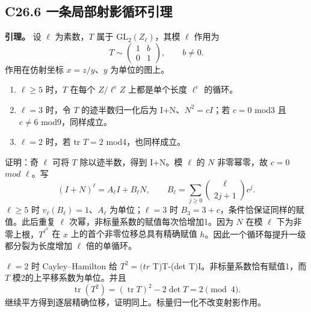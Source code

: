 \subsection*{\texorpdfstring{{C26.6} {一条局部射影循环引理}}{C26.6 一条局部射影循环引理}}\label{C26-h164}

\textbf{{引理。}} {设} {\ensuremath{\ell }} {为素数，\ensuremath{T}} {属于} {\ensuremath{\mathrm{GL}_{2}(Z_\ell )}，其模} {\ensuremath{\ell }} {作用为} \[
T\sim\begin{pmatrix}1&b\\0&1\end{pmatrix},\qquad b\ne0.
\] {作用在仿射坐标} {\ensuremath{x=z/y}、\ensuremath{y}} {为单位的图上。}

\begin{enumerate}
\def\labelenumi{\arabic{enumi}.}
\tightlist
\item
  {\ensuremath{\ell \ge 5}} {时，\ensuremath{T}} {在每个} {\ensuremath{Z/\ell ^{e}Z}} {上都是单个长度} {\ensuremath{\ell ^{e}}} {的循环。}
\item
  {\ensuremath{\ell =3}} {时，令} {\ensuremath{T}} {的迹半数归一化后为} {I+N、\ensuremath{N^{2}=cI}；若} {\ensuremath{c=0}} {mod3} {且} {\ensuremath{c\ne 6}} {mod9，同样成立。}
\item
  {\ensuremath{\ell =2}} {时，若} {tr} {\ensuremath{T=2}} {mod4，也同样成立。}
\end{enumerate}

{证明：奇} {\ensuremath{\ell }} {可将} {\ensuremath{T}} {除以迹半数，得到} {I+N。模} {\ensuremath{\ell }} {的} {\ensuremath{N}} {非零幂零，故} {\ensuremath{c=0}} {\ensuremath{mod}} {\ensuremath{\ell }。写} \[
(I+N)^\ell=A_\ell I+B_\ell N,\qquad
B_\ell=\sum_{j\ge0}\binom{\ell}{2j+1}c^j.
\] {\ensuremath{\ell \ge 5}} {时} {\ensuremath{v_\ell (B_\ell )=1}、\ensuremath{A_\ell }} {为单位；\ensuremath{\ell =3}} {时} {\ensuremath{B_{3}=3+c}，条件恰保证同样的赋值。此后重复} {\ensuremath{\ell }} {次幂，非标量系数的赋值每次恰增加1。因为} {\ensuremath{N}} {在模} {\ensuremath{\ell }} {下为非零上根，\ensuremath{T^{\ell ^{h}}}} {在} {\ensuremath{x}} {上的首个非零位移总具有精确赋值} {\ensuremath{h}。因此一个循环每提升一级都分裂为长度增加} {\ensuremath{\ell }} {倍的单循环。}

{\ensuremath{\ell =2}} {时} {Cayley--Hamilton} {给} {\ensuremath{T^{2}=(tr}} {T)T-(det} {T)I。非标量系数恰有赋值1，而} {\ensuremath{T}} {模2的上平移系数为单位。并且} \[
\operatorname{tr}(T^2)=(\operatorname{tr}T)^2-2\det T=2\pmod4.
\] {继续平方得到逐层精确位移，证明同上。标量归一化不改变射影作用。}

